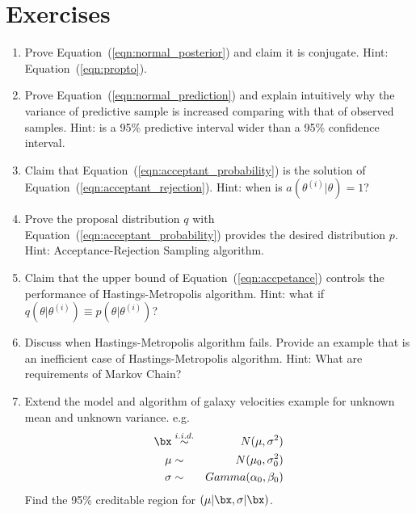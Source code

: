 \section{Exercises}
\label{sec:mle_exercise}

\begin{enumerate}[label=\thechapter-\arabic*]

\item
Prove Equation~(\ref{eqn:normal_posterior}) and claim it is conjugate.
{\color{blue} Hint: Equation~(\ref{eqn:propto}). }

\item
Prove Equation~(\ref{eqn:normal_prediction}) and explain intuitively why
the variance of predictive sample is increased comparing with that of
observed samples.
{\color{blue} Hint: is a 95\% predictive interval wider than a 95\% confidence
interval. }

\item
Claim that Equation~(\ref{eqn:acceptant_probability}) is the solution of
Equation~(\ref{eqn:acceptant_rejection}).
{\color{blue} Hint: when is $a(\theta^{(i)} | \theta) = 1$? }

\item
Prove the proposal distribution $q$ with
Equation~(\ref{eqn:acceptant_probability}) provides the desired
distribution $p$.
{\color{blue} Hint: Acceptance-Rejection Sampling algorithm. }

\item
Claim that the upper bound of Equation~(\ref{eqn:accpetance}) controls
the performance of Hastings-Metropolis algorithm.
{\color{blue} Hint: what if
$q(\theta | \theta^{(i)}) \equiv p(\theta | \theta^{(i)})$? }

\item
Discuss when Hastings-Metropolis algorithm fails. Provide an example
that is an inefficient case of Hastings-Metropolis algorithm.
{\color{blue} Hint: What are requirements of Markov Chain? }

\item
Extend the model and algorithm of galaxy velocities example
for unknown mean and unknown variance. e.g.
\begin{eqnarray*}
\bx & \stackrel{i.i.d.}{\sim} & N(\mu, \sigma^2) \\
\mu & \sim & N(\mu_0, \sigma_0^2) \\
\sigma & \sim & Gamma(\alpha_0, \beta_0)
\end{eqnarray*}
Find the 95\% creditable region for $(\mu|\bx, \sigma|\bx)$.


\end{enumerate}
